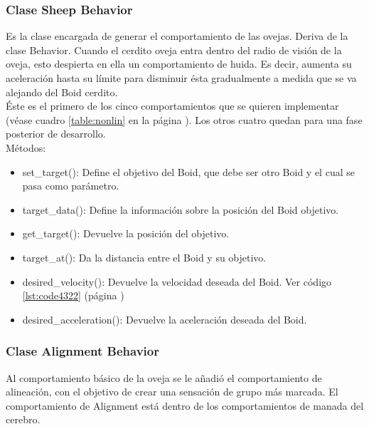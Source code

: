 \subsubsection{Clase Sheep Behavior}
\label{subsubsection:sheep_behavior}

Es la clase encargada de generar el comportamiento de las ovejas. Deriva de la clase Behavior. Cuando el cerdito oveja entra dentro del 
radio de visión de la oveja, esto despierta en ella un comportamiento de huida. Es decir, aumenta su aceleración hasta su límite para 
disminuir ésta gradualmente a medida que se va alejando del Boid cerdito.\\

Éste es el primero de los cinco comportamientos que se quieren implementar (véase cuadro \ref{table:nonlin} en la página \pageref{table:nonlin}). Los otros cuatro quedan para una fase 
posterior de desarrollo.\\

Métodos:
\begin{itemize}
\item set\_target():
Define el objetivo del Boid, que debe ser otro Boid y el cual se pasa como parámetro.

\item target\_data():
Define la información sobre la posición del Boid objetivo.

\item get\_target():
Devuelve la posición del objetivo.

\item target\_at():
Da la distancia entre el Boid y su objetivo.

\item desired\_velocity():
Devuelve la velocidad deseada del Boid. Ver código \ref{lst:code4322} (página \pageref{lst:code4322})

\item desired\_acceleration():
Devuelve la aceleración deseada del Boid.
\end{itemize}


\subsubsection{Clase Alignment Behavior}
\label{subsubsection:alignment_behavior}

Al comportamiento básico de la oveja se le añadió el comportamiento de alineación, con el objetivo de crear una sensación de grupo más 
marcada. El comportamiento de Alignment está dentro de los comportamientos de manada del cerebro.\\

